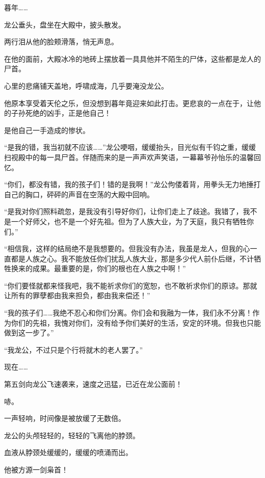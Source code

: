 \begin{this_body}
暮年……

龙公垂头，盘坐在大殿中，披头散发。

两行泪从他的脸颊滑落，悄无声息。

在他的面前，大殿冰冷的地砖上摆放着一具具他并不陌生的尸体，这些都是龙人的尸首。

心里的悲痛铺天盖地，呼啸成海，几乎要淹没龙公。

他原本享受着天伦之乐，但没想到暮年竟迎来如此打击。更悲哀的一点在于，让他的子孙死绝的凶手，正是他自己！

是他自己一手造成的惨状。

“是我的错，我当初就不应该……”龙公哽咽，缓缓抬头，目光似有千钧之重，缓缓扫视殿中的每一具尸首。伴随而来的是一声声欢声笑语，一幕幕爷孙怡乐的温馨回忆。

“你们，都没有错，我的孩子们！错的是我啊！”龙公佝偻着背，用拳头无力地捶打自己的胸口，砰砰的声音在空荡的大殿中回响。

“是我对你们照料疏忽，是我没有引导好你们，让你们走上了歧途。我错了，我不是一个好师父，也不是一个好先祖。但为了人族大业，为了天庭，我只有牺牲你们。”

“相信我，这样的结局绝不是我想要的。但我没有办法，我虽是龙人，但我的心一直都是人族之心。我不能放任你们扰乱人族大业，那是多少代人前仆后继，不计牺牲换来的成果。最重要的是，你们的根也在人族之中啊！”

“你们要怪就都来怪我吧，我不能祈求你们的宽恕，也不敢祈求你们的原谅。那就让所有的罪孽都由我来担负，都由我来偿还！”

“我的孩子们……我绝不忍心和你们分离。你们会和我融为一体，我们永不分离！作为你们的先祖，我愧对你们，没有给予你们美好的生活，安定的环境。但我也只能做到这一步了。”

“我龙公，不过只是个行将就木的老人罢了。”

现在……

第五剑向龙公飞速袭来，速度之迅猛，已近在龙公面前！

哧。

一声轻响，时间像是被放缓了无数倍。

龙公的头颅轻轻的，轻轻的飞离他的脖颈。

血液从脖颈处缓缓的，缓缓的喷涌而出。

他被方源一剑枭首！

\end{this_body}

